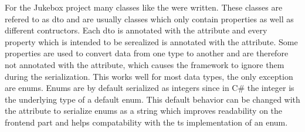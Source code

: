 For the Jukebox project many classes like the  were written. These classes are refered to as \gls{dto} and are usually  classes which only contain properties as well as different contructors. Each \gls{dto} is annotated with the \lstcode{[DataContract]} attribute and every property which is intended to be serealized is annotated with the \lstcode{[DataMemeber]} attribute. Some properties are used to convert data from one type to another and are therefore not annotated with the \lstcode{[DataMember]} attribute, which causes the framework to ignore them during the serialization. This works well for most data types, the only exception are enums. Enums are by default serialized as integers since in C\# the integer is the underlying type of a default enum. This default behavior can be changed with the  attribute to serialize enums as a string which improves readability on the frontend part and helps compatability with the \gls{ts} implementation of an enum.


















